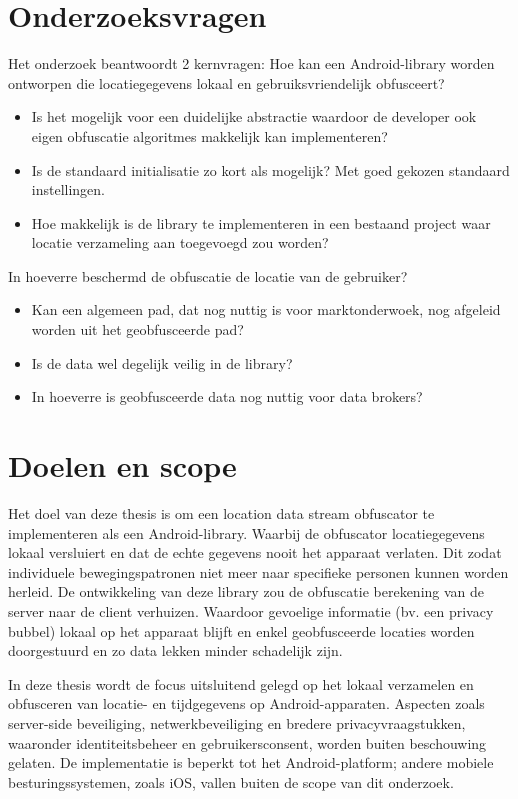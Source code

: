 \section{Onderzoeksvragen}
Het onderzoek beantwoordt 2 kernvragen:
Hoe kan een Android-library worden ontworpen die locatiegegevens lokaal en gebruiksvriendelijk obfusceert?
\begin{itemize}
    \item Is het mogelijk voor een duidelijke abstractie waardoor de developer ook eigen obfuscatie algoritmes makkelijk kan implementeren?
    \item Is de standaard initialisatie zo kort als mogelijk? Met goed gekozen standaard instellingen.
    \item Hoe makkelijk is de library te implementeren in een bestaand project waar locatie verzameling aan toegevoegd zou worden?
\end{itemize}
In hoeverre beschermd de obfuscatie de locatie van de gebruiker?
\begin{itemize}
    \item Kan een algemeen pad, dat nog nuttig is voor marktonderwoek, nog afgeleid worden uit het geobfusceerde pad?
    \item Is de data wel degelijk veilig in de library?
    \item In hoeverre is geobfusceerde data nog nuttig voor data brokers?
\end{itemize}
\section{Doelen en scope}
Het doel van deze thesis is om een location data stream obfuscator te implementeren als een Android-library. Waarbij de obfuscator locatiegegevens lokaal versluiert en dat de echte gegevens nooit het apparaat verlaten. Dit zodat individuele bewegingspatronen niet meer naar specifieke personen kunnen worden herleid.
De ontwikkeling van deze library zou de obfuscatie berekening van de server naar de client verhuizen. Waardoor gevoelige informatie (bv. een privacy bubbel) lokaal op het apparaat blijft en enkel geobfusceerde locaties worden doorgestuurd en zo data lekken minder schadelijk zijn.

In deze thesis wordt de focus uitsluitend gelegd op het lokaal verzamelen en obfusceren van locatie- en tijdgegevens op Android-apparaten.
Aspecten zoals server-side beveiliging, netwerkbeveiliging en bredere privacyvraagstukken, waaronder identiteitsbeheer en gebruikersconsent, worden buiten beschouwing gelaten. De implementatie is beperkt tot het Android-platform; andere mobiele besturingssystemen, zoals iOS, vallen buiten de scope van dit onderzoek.
